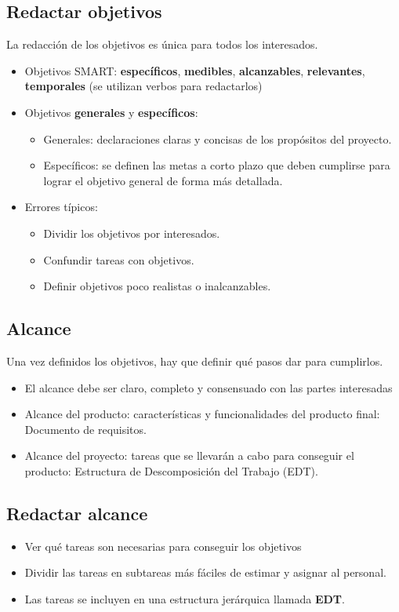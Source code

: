 \documentclass{article}
\begin{document}
\subsection{Redactar objetivos}
La redacción de los objetivos es única para todos los interesados.
\begin{itemize}
	\item Objetivos SMART: \textbf{específicos}, \textbf{medibles}, \textbf{alcanzables}, \textbf{relevantes}, \textbf{temporales} (se utilizan verbos para redactarlos)
	\item Objetivos \textbf{generales} y \textbf{específicos}:
	\begin{itemize}
		\item Generales: declaraciones claras y concisas de los propósitos del proyecto.
		\item Específicos: se definen las metas a corto plazo que deben cumplirse para lograr el objetivo general de forma más detallada.
	\end{itemize}
	\item Errores típicos:
	\begin{itemize}
		\item Dividir los objetivos por interesados.
		\item Confundir tareas con objetivos.
		\item Definir objetivos poco realistas o inalcanzables.
	\end{itemize}
\end{itemize}

\subsection{Alcance}

Una vez definidos los objetivos, hay que definir qué pasos dar para cumplirlos.
\begin{itemize}
	\item El alcance debe ser claro, completo y consensuado con las partes interesadas
	\item Alcance del producto: características y funcionalidades del producto final: Documento de requisitos.
	\item Alcance del proyecto: tareas que se llevarán a cabo para conseguir el producto: Estructura de Descomposición del Trabajo (EDT).
\end{itemize}

\subsection{Redactar alcance}
\begin{itemize}
	\item Ver qué tareas son necesarias para conseguir los objetivos
	\item Dividir las tareas en subtareas más fáciles de estimar y asignar al personal.
	\item Las tareas se incluyen en una estructura jerárquica llamada \textbf{EDT}.
\end{itemize}
\end{document}

